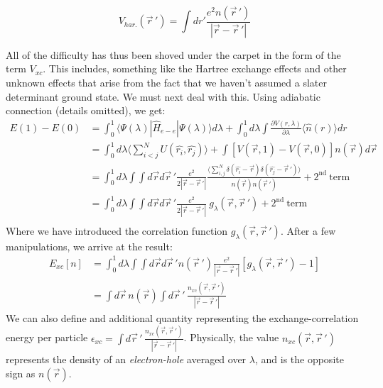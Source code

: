\message{ !name(dfpt.tex)}\documentclass[]{article}
\begin{document}
        \begin{equation} \label{eq:vhartree}
                V_{har.}({\vec{r}\,}') = \int dr' \frac{e^2 n({\vec{r}\,}')}{|\vec{r} - {\vec{r}\,}'|}
        \end{equation}

        All of the difficulty has thus been shoved under the carpet in the form of the
        term $V_{xc}$. This includes, something like the Hartree exchange effects and other
        unknown effects that arise from the fact that we haven't assumed a slater determinant
        ground state. We must next deal with this.
        Using adiabatic connection (details omitted), we get:
        \begin{equation}\label{eq:adiabat_cont}
        \begin{aligned}
          E(1) - E(0) &= \int_{0}^{1} \langle \Psi(\lambda)| \widehat{H}_{e-e}
          |\Psi(\lambda) \rangle d\lambda + \int_{0}^{1} d\lambda \int
          \frac{\partial V(r,\lambda)}{\partial \lambda}\langle\hat{n}(r)\rangle dr\\
          &= \int^{1}_{0} d\lambda \biggl\langle \sum_{i<j}^{N}U(\hat{r_i}, \hat{r_j})
          \biggr\rangle + \int [V(\vec{r}, 1) - V(\vec{r},0)]n(\vec{r})d\vec{r}\\
          &= \int^{1}_{0} d \lambda \int \int d \vec{r} d{\vec{r}\,}'
          \frac{e^2}{2|\vec{r} - {\vec{r}\,}'|} \frac{\biggl\langle \sum_{i,j}^{N}
           \delta(\hat{r_i} - \vec{r}) \delta(\hat{r_j} - {\vec{r}\,}') \biggr\rangle}
         {n(\vec{r})n({\vec{r}\,}')} + \mathrm{2^{nd}\  term}\\
         &= \int^{1}_{0} d \lambda \int \int d \vec{r} d{\vec{r}\,}'
         \frac{e^2}{2|\vec{r} - {\vec{r}\,}'|}\ g_\lambda(\vec{r}, {\vec{r}\,}')
         + \mathrm{2^{nd}\  term}\\
        \end{aligned}
      \end{equation}
      Where we have introduced the correlation function $g_\lambda(\vec{r}, {\vec{r}\,}')$. After a few
      manipulations, we arrive at the result:
      \begin{equation}
        \begin{aligned}
        \label{eq:9}
        E_{xc}[n] &= \int^{1}_{0}d\lambda \int \int d\vec{r} d{\vec{r}\,}' n({\vec{r}\,}')
        \frac{e^2}{|\vec{r} - {\vec{r}\,}'|} [g_\lambda(\vec{r}, {\vec{r}\,}') - 1]\\
        &= \int d\vec{r}\, n(\vec{r}) \int d{\vec{r}\,}'\, \frac{n_{xc}(\vec{r}, {\vec{r}\,}')}
        {|\vec{r} - {\vec{r}\,}'|}
        \end{aligned}
      \end{equation}
      We can also define and additional quantity representing the exchange-correlation
      energy per particle $\epsilon_{xc} = \int d{\vec{r}\,}'\, \frac{n_{xc}
        (\vec{r}, {\vec{r}\,}')}{|\vec{r} - {\vec{r}\,}'|}$. Physically, the value $n_{xc}(\vec{r}, {\vec{r}\,}')$ represents
      the density of an \textit{electron-hole} averaged over $\lambda$, and is the opposite sign as $n(\vec{r})$.
\end{document}

